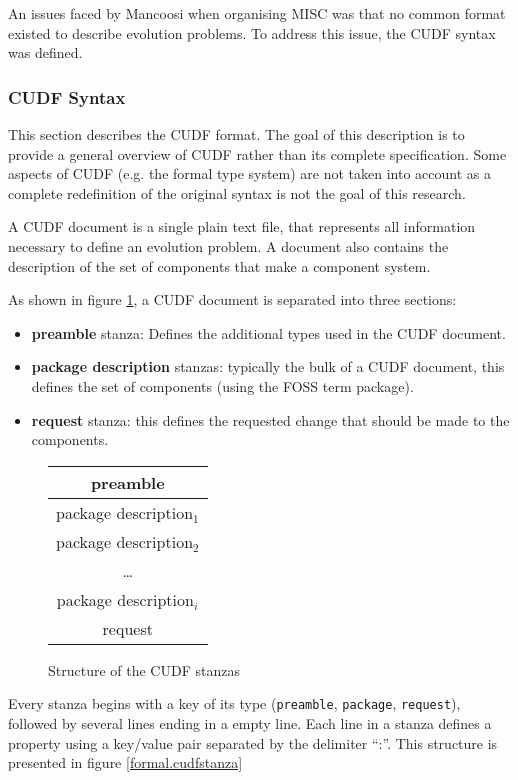 An issues faced by Mancoosi when organising MISC was that no common format existed to describe evolution problems.
To address this issue, the CUDF syntax \citep{treinen2009common} was defined.

\subsubsection{CUDF Syntax}
This section describes the CUDF format.
The goal of this description is to provide a general overview of CUDF rather than its complete specification.
Some aspects of CUDF (e.g. the formal type system) are not taken into account  as a complete redefinition of the original syntax is not the goal of this research.

A CUDF document is a single plain text file, that represents all information necessary to define an evolution problem.
A document also contains the description of the set of components that make a component system.

As shown in figure \ref{formal:cudfstruct}, a CUDF document is separated into three sections:
\begin{itemize}
  \item \textbf{preamble} stanza: Defines the additional types used in the CUDF document.
  \item \textbf{package description} stanzas: typically the bulk of a CUDF document, this defines the set of components (using the FOSS term package).
  \item \textbf{request} stanza: this defines the requested change that should be made to the components.
\end{itemize}

\begin{figure}[htp]
\centering
\begin{tabular}{|c|}
\hline preamble \\ \hline
\hline package description$_{1}$ \\ \hline
\hline package description$_{2}$ \\ \hline
 \multicolumn{1}{c}{\ldots}  \\ 
\hline package description$_{i}$\\ \hline
\hline request\\ \hline
\end{tabular}
\caption{Structure of the CUDF stanzas}
\label{formal:cudfstruct}
\end{figure}

Every stanza begins with a key of its type (\verb+preamble+, \verb+package+, \verb+request+), followed by several lines ending in a empty line.
Each line in a stanza defines a property using a key/value pair separated by the delimiter ``:''.
This structure is presented in figure \ref{formal.cudfstanza}

